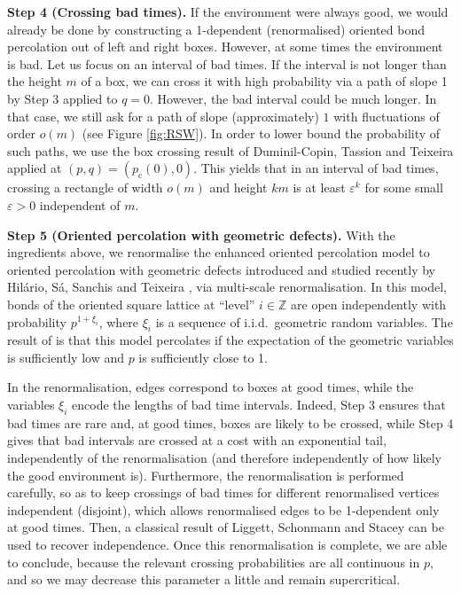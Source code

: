 \documentclass[pdflatex,sn-mathphys-num]{sn-jnl}%
\newcommand{\bbZ}{{\ensuremath{\mathbb Z}} }
\newcommand{\1}{{\ensuremath{\mathbf{1}}} }
\newcommand{\pc}{\ensuremath{p_{\mathrm{c}} }}
\theoremstyle{thmstyleone}%
\theoremstyle{thmstyletwo}%
\theoremstyle{thmstylethree}%
\begin{document}
{\bf Step 4 \rm{(Crossing bad times)}.}
If the environment were always good, we would already be done by constructing a 1-dependent (renormalised) oriented bond percolation out of left and right boxes. However, at some times the environment is bad. Let us focus on an interval of bad times. If the interval is not longer than the height $m$ of a box, we can cross it with high probability via a path of slope 1 by Step 3 applied to $q=0$. However, the bad interval could be much longer. In that case, we still ask for a path of slope (approximately) $1$ with fluctuations of order 
$o(m)$ (see Figure \ref{fig:RSW}). In order to lower bound the probability of such paths, we use the box crossing result of Duminil-Copin, Tassion and Teixeira \cite{Duminil-Copin17} applied at $(p,q)=(\pc(0),0)$. This yields that in an interval of bad times, crossing a rectangle of width $o(m)$ and height $k m$ is at least $\varepsilon^{k}$ for some small $\varepsilon>0$ independent of $m$.

{\bf Step 5 \rm{(Oriented percolation with geometric defects)}.}
With the ingredients above, we renormalise the enhanced oriented percolation model to oriented percolation with geometric defects introduced and studied recently by Hil\'ario, S\'a, Sanchis and Teixeira \cite{Hilario23}, via multi-scale renormalisation. In this model, bonds of the oriented square lattice at ``level'' $i\in\bbZ$ are open independently with probability $p^{1+\xi_i}$, where $\xi_i$ is a sequence of i.i.d.\ geometric random variables. The result of \cite{Hilario23} is that this model percolates if the expectation of the geometric variables is sufficiently low and $p$ is sufficiently close to 1. 

In the renormalisation, edges correspond to boxes at good times, while the 
variables $\xi_i$  encode the lengths of bad time intervals. Indeed, Step 3 ensures that bad times are rare and, at good times, boxes are likely to be crossed, while Step 4 gives that bad intervals are crossed at a cost with an exponential tail, independently of the renormalisation (and therefore independently of how likely the good environment is). Furthermore, the renormalisation is performed carefully, so as to keep crossings of bad times for different renormalised vertices independent (disjoint), which allows renormalised edges to be 1-dependent only at good times. Then, a classical result of Liggett, Schonmann and Stacey \cite{Liggett97} can be used to recover independence. Once this renormalisation is complete, we are able to conclude, because the relevant crossing probabilities are all continuous in $p$, and so we may decrease this parameter a little and remain supercritical.
\end{document}
